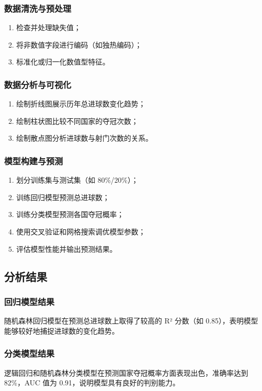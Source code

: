 \documentclass[UTF8]{ctexart}
\begin{document}
\subsubsection{数据清洗与预处理}
\begin{enumerate}
	\def\labelenumi{\arabic{enumi}.}
	\item 检查并处理缺失值；
	\item 将非数值字段进行编码（如独热编码）；
	\item 标准化或归一化数值型特征。
\end{enumerate}

\subsubsection{数据分析与可视化}
\begin{enumerate}
	\def\labelenumi{\arabic{enumi}.}
	\item 绘制折线图展示历年总进球数变化趋势；
	\item 绘制柱状图比较不同国家的夺冠次数；
	\item 绘制散点图分析进球数与射门次数的关系。
\end{enumerate}

\subsubsection{模型构建与预测}
\begin{enumerate}
	\def\labelenumi{\arabic{enumi}.}
	\item 划分训练集与测试集（如 80\%/20\%）；
	\item 训练回归模型预测总进球数；
	\item 训练分类模型预测各国夺冠概率；
	\item 使用交叉验证和网格搜索调优模型参数；
	\item 评估模型性能并输出预测结果。
\end{enumerate}

\subsection{分析结果}
\subsubsection{回归模型结果}
随机森林回归模型在预测总进球数上取得了较高的 R² 分数（如 0.85），表明模型能够较好地捕捉进球数的变化趋势。

\subsubsection{分类模型结果}
逻辑回归和随机森林分类模型在预测国家夺冠概率方面表现出色，准确率达到 82\%，AUC 值为 0.91，说明模型具有良好的判别能力。
\end{document}
